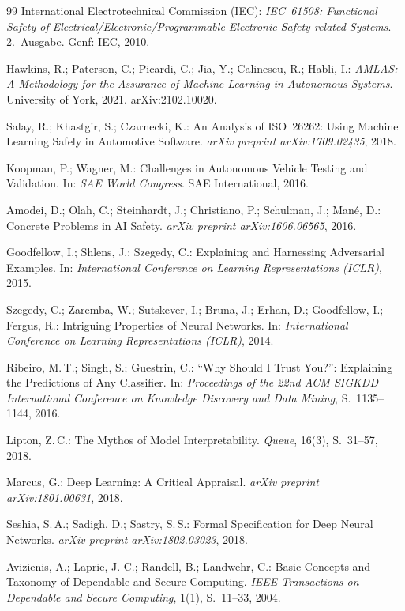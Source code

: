 ﻿\documentclass[12pt,a4paper]{article}
\begin{document}
\begin{thebibliography}{99}
International Electrotechnical Commission (IEC):
\textit{IEC~61508: Functional Safety of Electrical/Electronic/Programmable Electronic Safety-related Systems}.
2.~Ausgabe. Genf: IEC, 2010.

Hawkins, R.; Paterson, C.; Picardi, C.; Jia, Y.; Calinescu, R.; Habli, I.:
\textit{AMLAS: A Methodology for the Assurance of Machine Learning in Autonomous Systems}.
University of York, 2021.
arXiv:2102.10020.

Salay, R.; Khastgir, S.; Czarnecki, K.:
An Analysis of ISO~26262: Using Machine Learning Safely in Automotive Software.
\textit{arXiv preprint arXiv:1709.02435}, 2018.

Koopman, P.; Wagner, M.:
Challenges in Autonomous Vehicle Testing and Validation.
In: \textit{SAE World Congress}. SAE International, 2016.

Amodei, D.; Olah, C.; Steinhardt, J.; Christiano, P.; Schulman, J.; Man\'e, D.:
Concrete Problems in AI Safety.
\textit{arXiv preprint arXiv:1606.06565}, 2016.

Goodfellow, I.; Shlens, J.; Szegedy, C.:
Explaining and Harnessing Adversarial Examples.
In: \textit{International Conference on Learning Representations (ICLR)}, 2015.

Szegedy, C.; Zaremba, W.; Sutskever, I.; Bruna, J.; Erhan, D.; Goodfellow, I.; Fergus, R.:
Intriguing Properties of Neural Networks.
In: \textit{International Conference on Learning Representations (ICLR)}, 2014.

Ribeiro, M.\,T.; Singh, S.; Guestrin, C.:
``Why Should I Trust You?'': Explaining the Predictions of Any Classifier.
In: \textit{Proceedings of the 22nd ACM SIGKDD International Conference on Knowledge Discovery and Data Mining},
S.~1135--1144, 2016.

Lipton, Z.\,C.:
The Mythos of Model Interpretability.
\textit{Queue}, 16(3), S.~31--57, 2018.

Marcus, G.:
Deep Learning: A Critical Appraisal.
\textit{arXiv preprint arXiv:1801.00631}, 2018.

Seshia, S.\,A.; Sadigh, D.; Sastry, S.\,S.:
Formal Specification for Deep Neural Networks.
\textit{arXiv preprint arXiv:1802.03023}, 2018.

Avizienis, A.; Laprie, J.-C.; Randell, B.; Landwehr, C.:
Basic Concepts and Taxonomy of Dependable and Secure Computing.
\textit{IEEE Transactions on Dependable and Secure Computing}, 1(1), S.~11--33, 2004.


\end{thebibliography}
\end{document}
